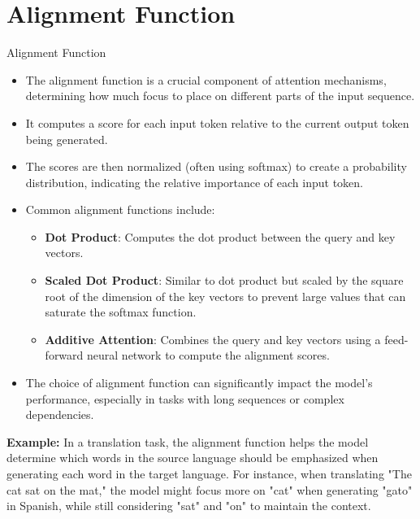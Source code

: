 \section{Alignment Function}
\begin{frame}[allowframebreaks]{Alignment Function}
    \begin{itemize}
        \setlength{\itemsep}{0.5em}
        \item The alignment function is a crucial component of attention mechanisms, determining how much focus to place on different parts of the input sequence.
        \item It computes a score for each input token relative to the current output token being generated.
        \item The scores are then normalized (often using softmax) to create a probability distribution, indicating the relative importance of each input token.
        \item Common alignment functions include:
        \begin{itemize}
            \item \textbf{Dot Product}: Computes the dot product between the query and key vectors.
            \item \textbf{Scaled Dot Product}: Similar to dot product but scaled by the square root of the dimension of the key vectors to prevent large values that can saturate the softmax function.
            \item \textbf{Additive Attention}: Combines the query and key vectors using a feed-forward neural network to compute the alignment scores.
        \end{itemize}
    
        \item The choice of alignment function can significantly impact the model's performance, especially in tasks with long sequences or complex dependencies.
    \end{itemize}
    \textbf{Example:} In a translation task, the alignment function helps the model determine which words in the source language should be emphasized when generating each word in the target language. For instance, when translating "The cat sat on the mat," the model might focus more on "cat" when generating "gato" in Spanish, while still considering "sat" and "on" to maintain the context.
\end{frame}

